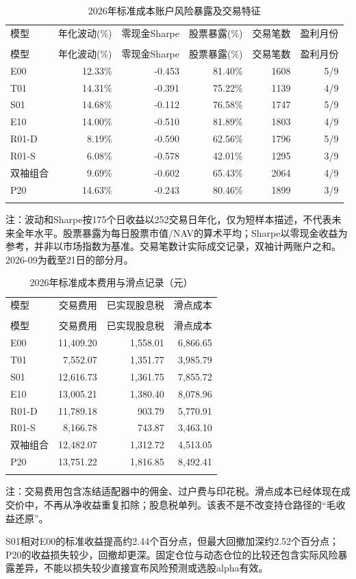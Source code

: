 \documentclass[12pt]{article}
\newcommand{\toprule}{\noalign{\hrule height .8pt}}
\newcommand{\midrule}{\noalign{\hrule height .4pt}}
\newcommand{\bottomrule}{\noalign{\hrule height .8pt}}
\begin{document}
{\small
\begin{longtable}{@{}lrrrrr@{}}
\caption{2026年标准成本账户风险暴露及交易特征}\label{tab:risk}\\
\toprule
模型 & 年化波动(\%) & 零现金Sharpe & 股票暴露(\%) & 交易笔数 & 盈利月份 \\
\midrule\endfirsthead
\multicolumn{6}{c}{表\thetable（续）}\\\toprule
模型 & 年化波动(\%) & 零现金Sharpe & 股票暴露(\%) & 交易笔数 & 盈利月份 \\
\midrule\endhead
E00 & 12.33\% & -0.453 & 81.40\% & 1608 & 5/9 \\
T01 & 14.31\% & -0.391 & 75.22\% & 1139 & 4/9 \\
S01 & 14.68\% & -0.112 & 76.58\% & 1747 & 5/9 \\
E10 & 14.00\% & -0.510 & 81.89\% & 1803 & 4/9 \\
R01-D & 8.19\% & -0.590 & 62.56\% & 1796 & 5/9 \\
R01-S & 6.08\% & -0.578 & 42.01\% & 1295 & 3/9 \\
双袖组合 & 9.69\% & -0.602 & 65.43\% & 2064 & 4/9 \\
P20 & 14.63\% & -0.243 & 80.46\% & 1899 & 3/9 \\
\bottomrule\end{longtable}}
{\footnotesize\noindent 注：波动和Sharpe按175个日收益以252交易日年化，仅为短样本描述，不代表未来全年水平。股票暴露为每日股票市值/NAV的算术平均；Sharpe以零现金收益为参考，并非以市场指数为基准。交易笔数计实际成交记录，双袖计两账户之和。2026-09为截至21日的部分月。\par}

{\small
\begin{longtable}{@{}lrrr@{}}
\caption{2026年标准成本费用与滑点记录（元）}\label{tab:costs}\\
\toprule
模型 & 交易费用 & 已实现股息税 & 滑点成本 \\
\midrule\endfirsthead
\multicolumn{4}{c}{表\thetable（续）}\\\toprule
模型 & 交易费用 & 已实现股息税 & 滑点成本 \\
\midrule\endhead
E00 & 11,409.20 & 1,558.01 & 6,866.65 \\
T01 & 7,552.07 & 1,351.77 & 3,985.79 \\
S01 & 12,616.73 & 1,361.75 & 7,855.72 \\
E10 & 13,005.21 & 1,380.40 & 8,078.96 \\
R01-D & 11,789.18 & 903.79 & 5,770.91 \\
R01-S & 8,166.78 & 743.87 & 3,463.10 \\
双袖组合 & 12,482.07 & 1,312.72 & 4,513.05 \\
P20 & 13,751.22 & 1,816.85 & 8,492.41 \\
\bottomrule\end{longtable}}
{\footnotesize\noindent 注：交易费用包含冻结适配器中的佣金、过户费与印花税。滑点成本已经体现在成交价中，不再从净收益重复扣除；股息税单列。该表不是不改变持仓路径的“毛收益还原”。\par}
S01相对E00的标准收益提高约2.44个百分点，但最大回撤加深约2.52个百分点；P20的收益损失较少，回撤却更深。固定仓位与动态仓位的比较还包含实际风险暴露差异，不能以损失较少直接宣布风险预测或选股alpha有效。
\end{document}

